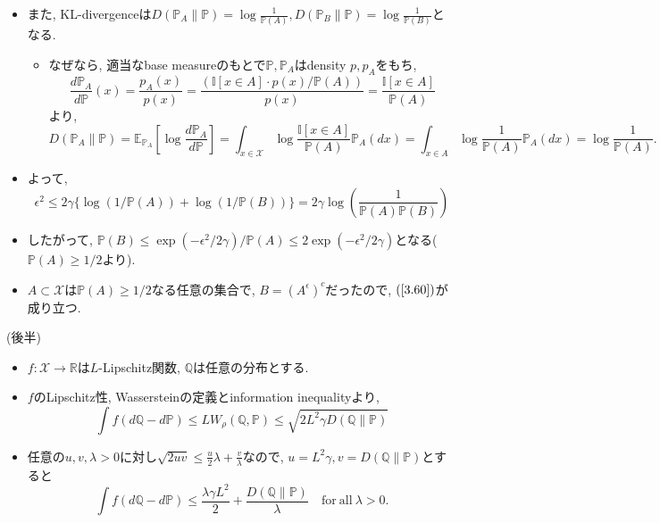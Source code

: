 \documentclass[aspectratio=169, dvipdfmx]{beamer}
\newcommand{\ex}{\mathbb{E}}
\newcommand{\bb}{\mathbb}
\newcommand{\cc}{\mathcal}
\begin{document}
\begin{frame}
\begin{itemize}
    \item また, KL-divergenceは$D(\bb{P}_A\|\bb{P}) = \log\frac{1}{\bb{P}(A)}, D(\bb{P}_B\|\bb{P}) = \log\frac{1}{\bb{P}(B)}$となる.
        \begin{itemize}
            \item なぜなら, 適当なbase measureのもとで$\bb{P}, \bb{P}_A$はdensity $p, p_A$をもち,
            \[
                \frac{d \bb{P}_A}{d \bb{P}}(x)
                = \frac{p_A(x)}{p(x)}
                = \frac{(\bb{I}[x \in A] \cdot p(x)/\bb{P}(A))}{p(x)}
                = \frac{\bb{I}[x \in A]}{\bb{P}(A)}
            \]
            より,
            \[
                D(\bb{P}_A\| \bb{P})
                = \ex_{\bb{P}_A}\left[\log \frac{d \bb{P}_A}{d \bb{P}}\right]
                = \int_{x \in \cc{X}} \log \frac{\bb{I}[x \in A]}{\bb{P} (A)} \bb{P}_A(dx)
                = \int_{x \in A} \log \frac{1}{\bb{P}(A)} \bb{P}_A(dx)
                = \log \frac{1}{\bb{P}(A)}.
            \]
        \end{itemize}
        \item よって,
            \[
                \epsilon^2
                \le 2\gamma\{\log(1/\bb{P}(A))+\log(1/\bb{P}(B))\}
                = 2\gamma \log\left(\frac{1}{\bb{P}(A)\bb{P}(B)}\right)
            \]
        \item したがって, $\bb{P}(B) \le \exp(-\epsilon^2/2\gamma) / \bb{P}(A) \le 2 \exp(-\epsilon^2/2\gamma)$となる($\bb{P}(A) \ge 1/2$より).
        \item $A \subset \cc{X}$は$\bb{P}(A)\ge 1/2$なる任意の集合で, $B = (A^\epsilon)^c$だったので, $(\ref{3.60})$が成り立つ.
\end{itemize}
\end{frame}

\begin{frame}
(後半)
\begin{itemize}
    \item $f:\cc{X} \to \bb{R}$は$L$-Lipschitz関数, $\bb{Q}$は任意の分布とする.
    \item $f$のLipschitz性, Wassersteinの定義とinformation inequalityより,
    \[
        \int f (d\bb{Q}-d\bb{P})
        \le L W_\rho(\bb{Q},\bb{P}) 
        \le \sqrt{2 L^2 \gamma D(\bb{Q} \| \bb{P})}
    \]
    \item 任意の$u, v, \lambda > 0$に対し$\sqrt{2uv} \le \frac{u}{2}\lambda + \frac{v}{\lambda}$なので,
    $u = L^2 \gamma, v = D(\bb{Q}\| \bb{P})$とすると
    \[ 
        \int f (d\bb{Q} - d\bb{P})
        \le \frac{\lambda \gamma L^2}{2} + \frac{D(\bb{Q}\| \bb{P})}{\lambda}
        \quad \mathrm{for\ all}\ \lambda > 0.
        \tag{3.63}\label{3.63}
    \]
\end{itemize}
\end{frame}
\end{document}
